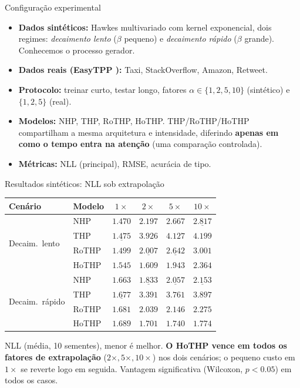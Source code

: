 \documentclass[aspectratio=169,9pt]{beamer}
\begin{document}
\begin{frame}{Configuração experimental}
  \begin{itemize}
    \item \textbf{Dados sintéticos:} Hawkes multivariado com kernel exponencial,
          dois regimes: \emph{decaimento lento} ($\beta$ pequeno) e
          \emph{decaimento rápido} ($\beta$ grande). Conhecemos o processo gerador.
    \item \textbf{Dados reais (EasyTPP \cite{xue2024easytpp}):} Taxi, StackOverflow,
          Amazon, Retweet.
    \item \textbf{Protocolo:} treinar curto, testar longo, fatores
          $\alpha \in \{1,2,5,10\}$ (sintético) e $\{1,2,5\}$ (real).
    \item \textbf{Modelos:} NHP, THP, RoTHP, HoTHP. THP/RoTHP/HoTHP compartilham a
          mesma arquitetura e intensidade, diferindo \textbf{apenas em como o
          tempo entra na atenção} (uma comparação controlada).
    \item \textbf{Métricas:} NLL (principal), RMSE, acurácia de tipo. 
  \end{itemize}
\end{frame}

\begin{frame}{Resultados sintéticos: NLL sob extrapolação}
  \begin{table}
    \centering \small
    \begin{tabular}{llcccc}
      \toprule
      Cenário & Modelo & $1\times$ & $2\times$ & $5\times$ & $10\times$ \\
      \midrule
      \multirow{4}{*}{Decaim.\ lento}
        & NHP    & $\mathbf{1.470}$ & $2.197$ & $2.667$ & $\underline{2.817}$ \\
        & THP    & $\underline{1.475}$ & $3.926$ & $4.127$ & $4.199$ \\
        & RoTHP  & $1.499$ & $\underline{2.007}$ & $\underline{2.642}$ & $3.001$ \\
        & HoTHP  & $1.545$ & $\mathbf{1.609}$ & $\mathbf{1.943}$ & $\mathbf{2.364}$ \\
      \midrule
      \multirow{4}{*}{Decaim.\ rápido}
        & NHP    & $\mathbf{1.663}$ & $\underline{1.833}$ & $\underline{2.057}$ & $\underline{2.153}$ \\
        & THP    & $\underline{1.677}$ & $3.391$ & $3.761$ & $3.897$ \\
        & RoTHP  & $1.681$ & $2.039$ & $2.146$ & $2.275$ \\
        & HoTHP  & $1.689$ & $\mathbf{1.701}$ & $\mathbf{1.740}$ & $\mathbf{1.774}$ \\
      \bottomrule
    \end{tabular}
  \end{table}
  \vspace{0.2em}
  {\small NLL (média, 10 sementes), menor é melhor. \textbf{O HoTHP vence em todos
  os fatores de extrapolação} ($2\times, 5\times, 10\times$) nos dois cenários; o
  pequeno custo em $1\times$ se reverte logo em seguida. Vantagem significativa
  (Wilcoxon, $p<0.05$) em todos os casos.}
\end{frame}
\end{document}
